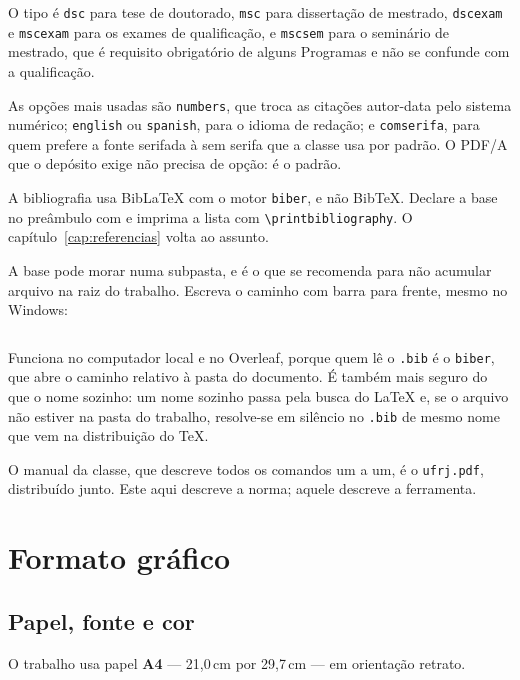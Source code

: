 \documentclass[dsc]{ufrj}
\begin{document}
  O tipo é \verb|dsc| para tese de doutorado, \verb|msc| para dissertação de
  mestrado, \verb|dscexam| e \verb|mscexam| para os exames de qualificação, e
  \verb|mscsem| para o seminário de mestrado, que é requisito obrigatório de
  alguns Programas e não se confunde com a qualificação.

  As opções mais usadas são \verb|numbers|, que troca as citações autor-data
  pelo sistema numérico; \verb|english| ou \verb|spanish|, para o idioma de
  redação; e \verb|comserifa|, para quem prefere a fonte serifada à sem serifa
  que a classe usa por padrão. O PDF/A que o depósito exige não precisa de
  opção: é o padrão.

  A bibliografia usa BibLaTeX com o motor \texttt{biber}, e não BibTeX. Declare
  a base no preâmbulo com \verb|| e imprima a lista
  com \verb|\printbibliography|. O capítulo~\ref{cap:referencias} volta ao
  assunto.

  A base pode morar numa subpasta, e é o que se recomenda para não acumular
  arquivo na raiz do trabalho. Escreva o caminho com barra para frente, mesmo
  no Windows:

\begin{verbatim}

\end{verbatim}

  \noindent Funciona no computador local e no Overleaf, porque quem lê o
  \texttt{.bib} é o \texttt{biber}, que abre o caminho relativo à pasta do
  documento. É também mais seguro do que o nome sozinho: um nome sozinho passa
  pela busca do \LaTeX{} e, se o arquivo não estiver na pasta do trabalho,
  resolve-se em silêncio no \texttt{.bib} de mesmo nome que vem na distribuição
  do \TeX.

  O manual da classe, que descreve todos os comandos um a um, é o
  \texttt{ufrj.pdf}, distribuído junto. Este aqui descreve a norma; aquele
  descreve a ferramenta.

  \chapter{Formato gráfico}

  \section{Papel, fonte e cor}

  O trabalho usa papel \textbf{A4} --- 21{,}0\,cm por 29{,}7\,cm --- em
  orientação retrato.
\end{document}
